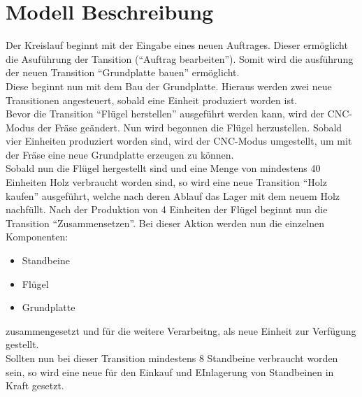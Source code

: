 \chapter{Modell Beschreibung}
Der Kreislauf beginnt mit der Eingabe eines neuen Auftrages. Dieser ermöglicht die Asuführung der Tansition ("`Auftrag bearbeiten"').
Somit wird die ausführung der neuen Transition "`Grundplatte bauen"' ermöglicht. \\ Diese beginnt nun mit dem Bau der Grundplatte. Hieraus werden zwei neue Transitionen angesteuert, sobald eine Einheit produziert worden ist. \\ Bevor die Transition "`Flügel herstellen"' ausgeführt werden kann, wird der CNC-Modus der Fräse geändert.  Nun wird begonnen die Flügel herzustellen. Sobald vier Einheiten produziert worden sind, wird der CNC-Modus umgestellt, um mit der Fräse eine neue Grundplatte erzeugen zu können. \\ Sobald nun die Flügel hergestellt sind und eine Menge von mindestens 40 Einheiten Holz verbraucht worden sind, so wird eine neue Transition "`Holz kaufen"' ausgeführt, welche nach deren Ablauf das Lager mit dem neuem Holz nachfüllt. Nach der Produktion von 4 Einheiten der Flügel beginnt nun die Transition "`Zusammensetzen"'. Bei dieser Aktion werden nun die einzelnen Komponenten: \begin{itemize}
	\itemsep0pt
	\item Standbeine
	\item Flügel
	\item Grundplatte
\end{itemize} zusammengesetzt und für die weitere Verarbeitng, als neue Einheit zur Verfügung gestellt. \\ Sollten nun bei dieser Transition mindestens 8 Standbeine verbraucht worden sein, so wird eine neue für den Einkauf und EInlagerung von Standbeinen in Kraft gesetzt.